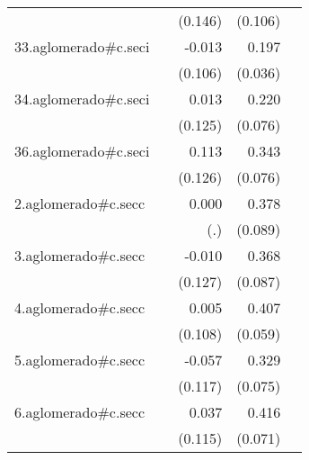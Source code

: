{\begin{longtable}{l*{4}{D{.}{.}{-1}}}
            &                     &     (0.146)         &     (0.106)         &                     \\
\addlinespace
33.aglomerado#c.seci&                     &      -0.013         &       0.197\sym{***}&                     \\
            &                     &     (0.106)         &     (0.036)         &                     \\
\addlinespace
34.aglomerado#c.seci&                     &       0.013         &       0.220\sym{**} &                     \\
            &                     &     (0.125)         &     (0.076)         &                     \\
\addlinespace
36.aglomerado#c.seci&                     &       0.113         &       0.343\sym{***}&                     \\
            &                     &     (0.126)         &     (0.076)         &                     \\
\addlinespace
2.aglomerado#c.secc&                     &       0.000         &       0.378\sym{***}&                     \\
            &                     &         (.)         &     (0.089)         &                     \\
\addlinespace
3.aglomerado#c.secc&                     &      -0.010         &       0.368\sym{***}&                     \\
            &                     &     (0.127)         &     (0.087)         &                     \\
\addlinespace
4.aglomerado#c.secc&                     &       0.005         &       0.407\sym{***}&                     \\
            &                     &     (0.108)         &     (0.059)         &                     \\
\addlinespace
5.aglomerado#c.secc&                     &      -0.057         &       0.329\sym{***}&                     \\
            &                     &     (0.117)         &     (0.075)         &                     \\
\addlinespace
6.aglomerado#c.secc&                     &       0.037         &       0.416\sym{***}&                     \\
            &                     &     (0.115)         &     (0.071)         &                     \\

\end{longtable}}
